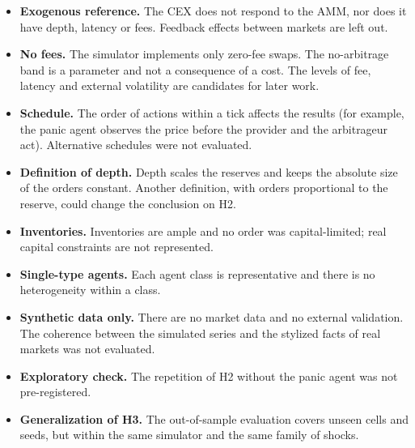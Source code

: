 \begin{itemize}
  \item \textbf{Exogenous reference.} The CEX does not respond to the AMM, nor does it have depth, latency or fees. Feedback effects between markets are left out.
  \item \textbf{No fees.} The simulator implements only zero-fee swaps. The no-arbitrage band is a parameter and not a consequence of a cost. The levels of fee, latency and external volatility are candidates for later work.
  \item \textbf{Schedule.} The order of actions within a tick affects the results (for example, the panic agent observes the price before the provider and the arbitrageur act). Alternative schedules were not evaluated.
  \item \textbf{Definition of depth.} Depth scales the reserves and keeps the absolute size of the orders constant. Another definition, with orders proportional to the reserve, could change the conclusion on H2.
  \item \textbf{Inventories.} Inventories are ample and no order was capital-limited; real capital constraints are not represented.
  \item \textbf{Single-type agents.} Each agent class is representative and there is no heterogeneity within a class.
  \item \textbf{Synthetic data only.} There are no market data and no external validation. The coherence between the simulated series and the stylized facts of real markets was not evaluated.
  \item \textbf{Exploratory check.} The repetition of H2 without the panic agent was not pre-registered.
  \item \textbf{Generalization of H3.} The out-of-sample evaluation covers unseen cells and seeds, but within the same simulator and the same family of shocks.
\end{itemize}
